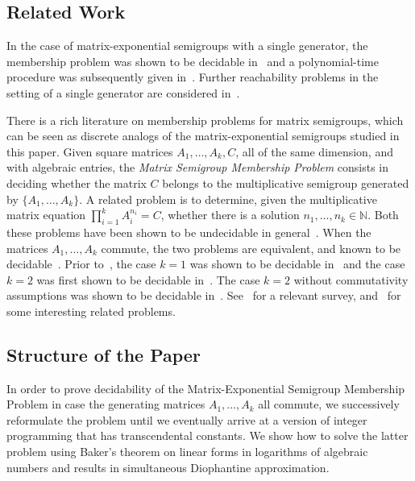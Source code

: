 \documentclass[format=acmsmall, review=false, screen=true]{acmart}
\newcommand{\Naturals}{\mathbb{N}}
\begin{document}
\subsection{Related Work}
\label{sec:lics_related_work}

In the case of matrix-exponential semigroups with a single generator,
the membership problem was shown to be decidable in~\cite{Hainry08}
and a polynomial-time procedure was subsequently given
in~\cite{ContinuousOrbitIPL}.  Further reachability problems in the
setting of a single generator are considered
in~\cite{ContinuousSkolem}.

There is a rich literature on membership problems for matrix
semigroups, which can be seen as discrete analogs of the
matrix-exponential semigroups studied in this paper.  Given 
square matrices $A_{1}, \ldots, A_{k}, C$, all of the same dimension,
and with algebraic entries, the \emph{Matrix Semigroup Membership
  Problem} consists in deciding whether the matrix $C$ belongs to the
multiplicative semigroup generated by $\lbrace A_{1}, \ldots, A_{k}
\rbrace$.  A related problem is to determine, given the multiplicative
matrix equation $\prod\limits_{i=1}^{k} A_{i}^{n_{i}} = C$, whether
there is a solution $n_{1}, \ldots, n_{k} \in \Naturals$.  Both
these problems have been shown to be undecidable in
general~\cite{Paterson,MEHTP}.  When the matrices $A_{1}, \ldots,
A_{k}$ commute, the two problems are equivalent, and known to be
decidable~\cite{MultiplicativeMatrixEquations}.  Prior
to~\cite{MultiplicativeMatrixEquations}, the case $k=1$ was shown to
be decidable in~\cite{KL86} and the case $k=2$ was first shown to be
decidable in~\cite{ABC}.  The case $k=2$ without commutativity
assumptions was shown to be decidable in~\cite{MEHTP}.
See~\cite{HalavaSurvey} for a relevant survey, and~\cite{CK05} for
some interesting related problems.

\subsection{Structure of the Paper}
\label{sec:structure}
In order to prove decidability of the Matrix-Exponential Semigroup
Membership Problem in case the generating matrices $A_1,\ldots,A_k$
all commute, we successively reformulate the problem until we
eventually arrive at a version of integer programming that has
transcendental constants.  We show how to solve the latter problem
using Baker's theorem on linear forms in logarithms of algebraic
numbers and results in simultaneous Diophantine approximation.
\end{document}
